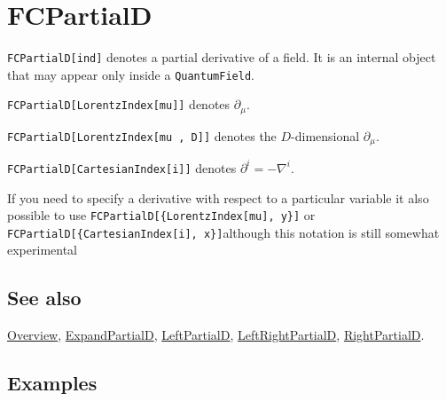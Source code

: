 \documentclass[../FeynCalcManual.tex]{subfiles}
\begin{document}
\hypertarget{fcpartiald}{%
\section{FCPartialD}\label{fcpartiald}}

\texttt{FCPartialD[\allowbreak{}ind]} denotes a partial derivative of a
field. It is an internal object that may appear only inside a
\texttt{QuantumField}.

\texttt{FCPartialD[\allowbreak{}LorentzIndex[\allowbreak{}mu]]} denotes
\(\partial_{\mu }\).

\texttt{FCPartialD[\allowbreak{}LorentzIndex[\allowbreak{}mu ,\ \allowbreak{}D]]}
denotes the \(D\)-dimensional \(\partial_{\mu }\).

\texttt{FCPartialD[\allowbreak{}CartesianIndex[\allowbreak{}i]]} denotes
\(\partial^{i} = - \nabla^i\).

If you need to specify a derivative with respect to a particular
variable it also possible to use
\texttt{FCPartialD[\allowbreak{}\{\allowbreak{}LorentzIndex[\allowbreak{}mu],\ \allowbreak{}y\}]}
or
\texttt{FCPartialD[\allowbreak{}\{\allowbreak{}CartesianIndex[\allowbreak{}i],\ \allowbreak{}x\}]}although
this notation is still somewhat experimental

\subsection{See also}

\hyperlink{toc}{Overview}, \hyperlink{expandpartiald}{ExpandPartialD},
\hyperlink{leftpartiald}{LeftPartialD},
\hyperlink{leftrightpartiald}{LeftRightPartialD},
\hyperlink{rightpartiald}{RightPartialD}.

\subsection{Examples}

\begin{Shaded}
\begin{Highlighting}[]
\OperatorTok{[}\OperatorTok{,} \OperatorTok{\{}\SpecialCharTok{\textbackslash{}}\OperatorTok{[}\OperatorTok{]\}]}\OperatorTok{[}\SpecialCharTok{\textbackslash{}}\OperatorTok{[}\OperatorTok{]]} 
 
\ExtensionTok{=}\OperatorTok{[}\SpecialCharTok{\%}\OperatorTok{]}
\end{Highlighting}
\end{Shaded}
\end{document}
